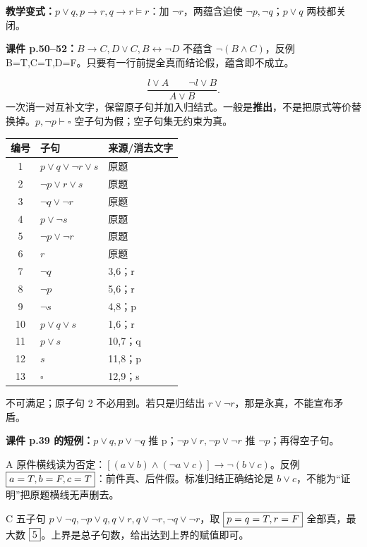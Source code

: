 \textbf{教学变式：}$p\lor q,p\to r,q\to r\models r$：加 $\neg r$，两蕴含迫使 $\neg p,\neg q$；$p\lor q$ 两枝都关闭。

\textbf{课件 p.50--52：}$B\to C,D\lor C,B\leftrightarrow\neg D$ 不蕴含 $\neg(B\land C)$，反例 B=T,C=T,D=F。只要有一行前提全真而结论假，蕴含即不成立。

\label{ex:resolution}
\[
\frac{l\lor A\qquad\neg l\lor B}{A\lor B}.
\]
一次消一对互补文字，保留原子句并加入归结式。一般是\textbf{推出}，不是把原式等价替换掉。$p,\neg p\vdash\square$ 空子句为假；空子句集无约束为真。
\begin{center}\begin{tabular}{c|l|l}\toprule
编号&子句&来源/消去文字\\\midrule
1&$p\lor q\lor\neg r\lor s$&原题\\
2&$\neg p\lor r\lor s$&原题\\
3&$\neg q\lor\neg r$&原题\\
4&$p\lor\neg s$&原题\\
5&$\neg p\lor\neg r$&原题\\
6&$r$&原题\\\midrule
7&$\neg q$&3,6；r\\
8&$\neg p$&5,6；r\\
9&$\neg s$&4,8；p\\
10&$p\lor q\lor s$&1,6；r\\
11&$p\lor s$&10,7；q\\
12&$s$&11,8；p\\
13&$\square$&12,9；s\\\bottomrule
\end{tabular}\end{center}
不可满足；原子句 2 不必用到。若只是归结出 $r\lor\neg r$，那是永真，不能宣布矛盾。

\textbf{课件 p.39 的短例：}$p\lor q,p\lor\neg q$ 推 p；$\neg p\lor r,\neg p\lor\neg r$ 推 $\neg p$；再得空子句。

A 原件横线读为否定：$[(a\lor b)\land(\neg a\lor c)]\to\neg(b\lor c)$。反例 $\boxed{a=T,b=F,c=T}$：前件真、后件假。标准归结正确结论是 $b\lor c$，不能为“证明”把原题横线无声删去。

C 五子句 $p\lor\neg q,\neg p\lor q,q\lor r,q\lor\neg r,\neg q\lor\neg r$，取 $\boxed{p=q=T,r=F}$ 全部真，最大数 $\boxed{5}$。上界是总子句数，给出达到上界的赋值即可。

